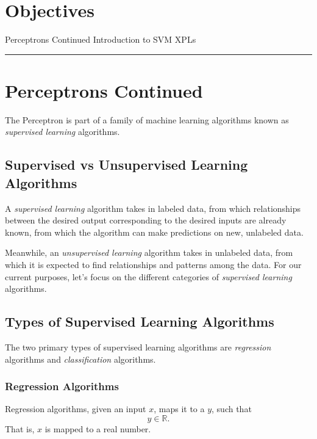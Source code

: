 \section*{Objectives}
\begin{outline}
    \1 Perceptrons Continued
    \1 Introduction to SVM
    \1 XPLs
\end{outline}

\rule[0.0051in]{\textwidth}{0.00025in}

\section{Perceptrons Continued}
The Perceptron is part of a family of machine learning algorithms known as \textit{supervised learning} algorithms.

\subsection{Supervised vs Unsupervised Learning Algorithms}
A \textit{supervised learning} algorithm takes in labeled data, from which relationships between the desired output corresponding to the desired inputs are already known, from which the algorithm can make predictions on new, unlabeled data.

Meanwhile, an \textit{unsupervised learning} algorithm takes in unlabeled data, from which it is expected to find relationships and patterns among the data. For our current purposes, let's focus on the different categories of \textit{supervised learning} algorithms.

\subsection{Types of Supervised Learning Algorithms}
The two primary types of supervised learning algorithms are \textit{regression} algorithms and \textit {classification} algorithms.

\subsubsection{Regression Algorithms}
Regression algorithms, given an input $x$, maps it to a $y$, such that
\[
    y \in \mathbb{R}.
\]
That is, $x$ is mapped to a real number.

